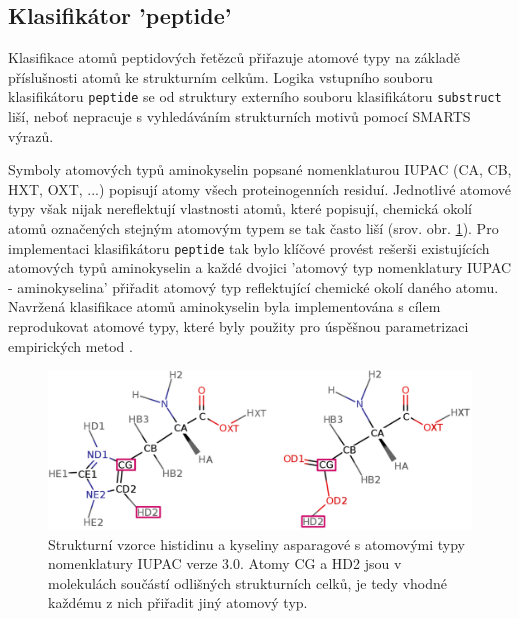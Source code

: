 \subsection{Klasifikátor 'peptide'}
\label{peptide_section}
Klasifikace atomů peptidových řetězců přiřazuje atomové typy na základě příslušnosti atomů ke strukturním celkům. Logika vstupního souboru klasifikátoru \verb|peptide| se od struktury externího souboru klasifikátoru \verb|substruct| liší, neboť nepracuje s vyhledáváním strukturních motivů pomocí SMARTS výrazů. 

Symboly atomových typů aminokyselin popsané nomenklaturou IUPAC (CA, CB, HXT, OXT, ...) popisují atomy všech proteinogenních residuí. Jednotlivé atomové typy však nijak nereflektují vlastnosti atomů, které popisují, chemická okolí ato\-mů označených stejným atomovým typem se tak často liší (srov. obr. \ref{aa_different_atom_types}). Pro implementaci klasifikátoru \verb|peptide| tak bylo klíčové provést rešerši existujících atomových typů aminokyselin a
každé dvojici 'atomový typ  nomenklatury IUPAC - aminokyselina' přiřadit atomový typ reflektující chemické okolí daného atomu. Navržená klasifikace atomů aminokyselin byla implementována s cílem reprodukovat atomové typy, které byly použity pro úspěšnou parametrizaci empirických metod \cite{GDAC, attyp_peptides}.

\begin{figure}[H]
\label{aa_different_atom_types}
\begin{center}
\includegraphics[width=13.5cm]{pictures/asp_his_merged_squares.png}
\caption{Strukturní vzorce histidinu a kyseliny asparagové s atomovými typy nomenklatury IUPAC verze 3.0. Atomy CG a HD2 jsou v molekulách součástí odlišných strukturních celků, je tedy vhodné každému z nich přiřadit jiný atomový typ.}
\end{center}
\end{figure}




 



